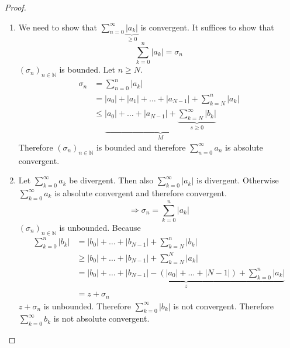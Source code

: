 \documentclass[a4paper,landscape,twocolumn]{article}
\newcommand\abs[1]{\left|#1\right|}
\newcommand\seq[1]{{\left(#1\right)}_{n \in \mathbb N}}
\begin{document}
\begin{proof}
  \begin{enumerate}
    \item
      We need to show that $\sum_{n=0}^\infty \underbrace{\abs{a_k}}_{\geq 0}$ is convergent.
      It suffices to show that
      \[ \sum_{k=0}^n \abs{a_k} = \sigma_n \]
      $\seq{\sigma_n}$ is bounded. Let $n \geq N$.
      \begin{align*}
        \sigma_n &= \sum_{n=0}^n \abs{a_k} \\
          &= \abs{a_0} + \abs{a_1} + \dots + \abs{a_{N-1}} + \sum_{k=N}^n \abs{a_k} \\
          &\leq \underbrace{\abs{a_0} + \dots + \abs{a_{N-1}} + \underbrace{\sum_{k=N}^\infty \abs{b_k}}_{s \geq 0}}_{M}
      \end{align*}
      Therefore $\seq{\sigma_n}$ is bounded and therefore $\sum_{n=0}^\infty a_n$ is absolute convergent.
    \item
      Let $\sum_{k=0}^\infty a_k$ be divergent. Then also $\sum_{k=0}^\infty \abs{a_k}$ is divergent.
      Otherwise $\sum_{k=0}^\infty a_k$ is absolute convergent and therefore convergent.
      \[ \Rightarrow \sigma_n = \sum_{k=0}^n \abs{a_k} \]
      $\seq{\sigma_n}$ is unbounded. Because
      \begin{align*}
        \sum_{k=0}^n \abs{b_k}
          &= \abs{b_0} + \dots + \abs{b_{N-1}} + \sum_{k=N}^n \abs{b_k} \\
          &\geq \abs{b_0} + \dots + \abs{b_{N-1}} + \sum_{k=N}^N \abs{a_k} \\
          &= \underbrace{\abs{b_0} + \dots + \abs{b_{N-1}} - \left(\abs{a_0} + \dots + \abs{N-1}\right) + \sum_{k=0}^n \abs{a_k}}_{z} \\
          &= z + \sigma_n
      \end{align*}
      $z + \sigma_n$ is unbounded. Therefore $\sum_{k=0}^\infty \abs{b_k}$ is not convergent.
      Therefore $\sum_{k=0}^\infty b_k$ is not absolute convergent.
  \end{enumerate}
\end{proof}
%
\end{document}
